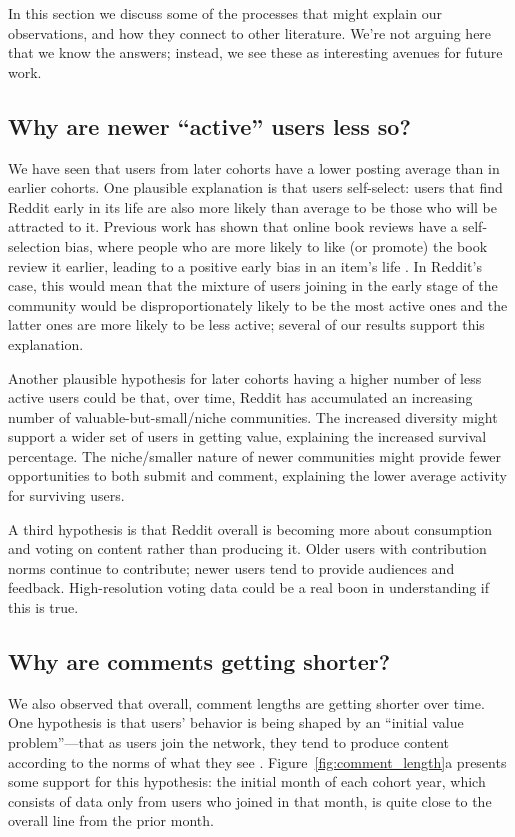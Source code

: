 In this section we discuss some of the processes that might explain our observations, and how they connect to other literature.  We're not arguing here that we know the answers; instead, we see these as interesting avenues for future work.

\subsection{Why are newer ``active'' users less so?}

We have seen that users from later cohorts have a lower posting average than in earlier cohorts. 
One plausible explanation is that users self-select: users that find Reddit early in its life are also more likely than average to be those who will be attracted to it. Previous work has shown that online book reviews have a self-selection bias, where people who are more likely to like (or promote) the book review it earlier, leading to a positive early bias in an item's life \cite{Li2008}.  In Reddit's case, this would mean that the mixture of users joining in the early stage of the community would be disproportionately likely to be the most active ones and the latter ones are more likely to be less active; several of our results support this explanation.

Another plausible hypothesis for later cohorts having a higher number of less active users could be that, over time, Reddit has accumulated an increasing number of valuable-but-small/niche communities.  The increased diversity might support a wider set of users in getting value, explaining the increased survival percentage.  The niche/smaller nature of newer communities might provide fewer opportunities to both submit and comment, explaining the lower average activity for surviving users. 

A third hypothesis is that Reddit overall is becoming more about consumption and voting on content rather than producing it.  Older users with contribution norms continue to contribute; newer users tend to provide audiences and feedback.  High-resolution voting data could be a real boon in understanding if this is true.

\subsection{Why are comments getting shorter?}

We also observed that overall, comment lengths are getting shorter over time.  
One hypothesis is that users' behavior is being shaped by an ``initial value problem''---that as users join the network, they tend to produce content according to the norms of what they see \cite{Kooti2010, Danescu-niculescu-mizil2013}. 
Figure~\ref{fig:comment_length}a presents some support for this hypothesis: the initial month of each cohort year, which consists of data only from users who joined in that month, is quite close to the overall line from the prior month.  

